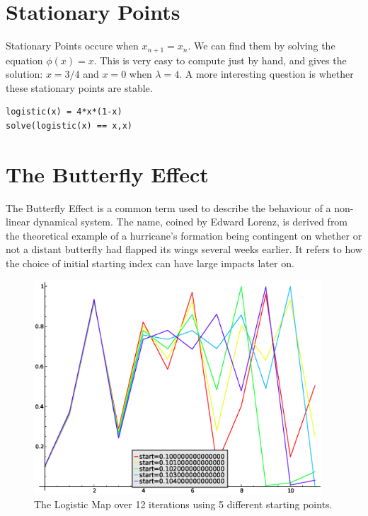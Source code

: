 \documentclass[a4paper]{article}
\begin{document}
\section{Stationary Points}
Stationary Points occure when $x_{n+1}=x_n$. We can find them by solving the equation $\phi(x)=x$. This is very easy to compute just by hand, and gives the solution: $x=3/4$ and $x=0$ when $\lambda =4$. A more interesting question is whether these stationary points are stable.

\begin{verbatim}
logistic(x) = 4*x*(1-x)
solve(logistic(x) == x,x)
\end{verbatim}


\section{The Butterfly Effect}
The Butterfly Effect is a common term used to describe the behaviour of a non-linear dynamical system. The name, coined by Edward Lorenz, is derived from the theoretical example of a hurricane's formation being contingent on whether or not a distant butterfly had flapped its wings several weeks earlier.\cite{wiki:xxx} It refers to how the choice of initial starting index can have large impacts later on.
\begin{figure}[htdp]
\begin{center}
\includegraphics[keepaspectratio=False, width=\linewidth,height=8cm]{butterflyeffect}
\end{center}
\caption{The Logistic Map over 12 iterations using 5 different starting points.}
\label{butterflyeffect}
\end{figure}



\end{document}
